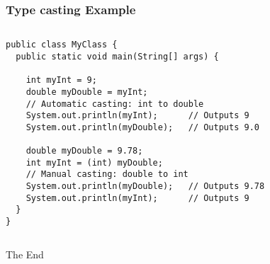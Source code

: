 \documentclass{beamer}
\begin{document}
\begin{frame}[fragile]
\frametitle{Type casting Example}
\begin{columns}[T]
\begin{column}{\textwidth}
\begin{lstlisting}
public class MyClass {
  public static void main(String[] args) {

    int myInt = 9;
    double myDouble = myInt; 
    // Automatic casting: int to double
    System.out.println(myInt);      // Outputs 9
    System.out.println(myDouble);   // Outputs 9.0

    double myDouble = 9.78;
    int myInt = (int) myDouble; 
    // Manual casting: double to int
    System.out.println(myDouble);   // Outputs 9.78
    System.out.println(myInt);      // Outputs 9
  }
}
\end{lstlisting}
\end{column}
\end{columns}
\end{frame}

\begin{frame}
\Huge{\centerline{The End}}
\end{frame}

\end{document}
